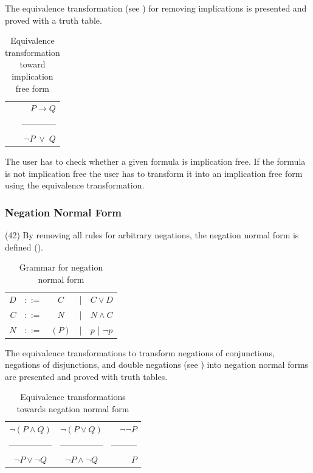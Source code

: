 The equivalence transformation (see ) 
for removing implications is presented
and proved with a truth table. 

\begin{table}[htdp]
\begin{center}
\begin{tabular}{r}
$P \rightarrow Q$ \\ 
————\\
$\neg P \;\vee\; Q$
\end{tabular}
\caption{Equivalence transformation toward implication free form}
\label{tab:ET_IFF}
\end{center}
\end{table}

The user has to check whether a given formula is implication free.
If the formula is not implication free the user has to transform it into an implication free form
using the equivalence transformation.

\subsubsection{Negation Normal Form}
\label{tut:42}

(42)
By removing all  rules for arbitrary negations, the negation normal form is defined
 (). 

\begin{table}[htdp]
\begin{center}
\begin{tabular}{rcccl}
$D$		&$::=$ & $C$ &|& $C \vee D$			\\
$C$		&$::=$ & $N$ &|& $N \wedge C$ 		\\
$N$		&$::=$ & $(P)$ & | & $p $ | $\neg p$
\end{tabular}
\caption{Grammar for negation normal form}
\label{tab:BNFGRNNF}
\end{center}
\end{table}

The equivalence transformations to transform negations of conjunctions,
negations of disjunctions, 
and double negations (see )
into negation normal forms are presented 
and proved with truth tables.

\begin{table}[htdp]
\begin{center}
\begin{tabular}{ccr}
$\neg (P \wedge Q) $&$ \neg (P \vee Q)$&$ \neg \neg P$\\
————— & —————& ———\\
$\neg P \vee \neg Q$&$\neg P \wedge \neg Q$&$P$
\end{tabular}
\caption{Equivalence transformations towards negation normal form}
\label{tab:ET_NNF}
\end{center}
\end{table}

